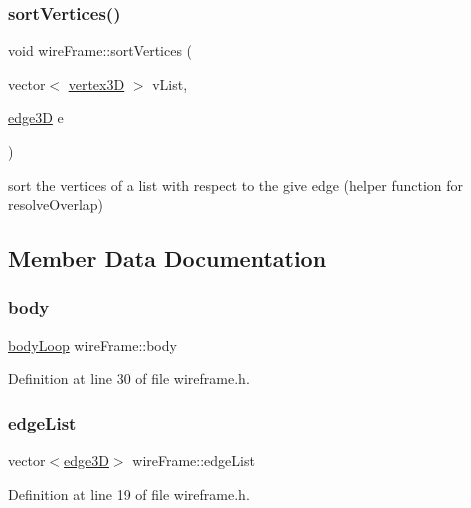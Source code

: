 \subsubsection{\texorpdfstring{sort\+Vertices()}{sortVertices()}}
{\footnotesize\ttfamily void wire\+Frame\+::sort\+Vertices (\begin{DoxyParamCaption}\item[{vector$<$ \mbox{\hyperlink{structvertex3_d}{vertex3D}} $>$}]{v\+List,  }\item[{\mbox{\hyperlink{structedge3_d}{edge3D}}}]{e }\end{DoxyParamCaption})}

sort the vertices of a list with respect to the give edge (helper function for resolve\+Overlap) 

\subsection{Member Data Documentation}
\mbox{\label{classwire_frame_a21133365b1a54c197741351a16a4e061}} 
\subsubsection{\texorpdfstring{body}{body}}
{\footnotesize\ttfamily \mbox{\hyperlink{classbody_loop}{body\+Loop}} wire\+Frame\+::body}



Definition at line 30 of file wireframe.\+h.

\mbox{\label{classwire_frame_af9b75331150dbb28588ae24a8d6ecf52}} 
\subsubsection{\texorpdfstring{edge\+List}{edgeList}}
{\footnotesize\ttfamily vector$<$\mbox{\hyperlink{structedge3_d}{edge3D}}$>$ wire\+Frame\+::edge\+List}



Definition at line 19 of file wireframe.\+h.

\mbox{\label{classwire_frame_a443c6e0a6695cd71527edfeff03ae7e6}} 
